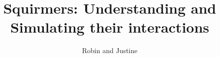 \documentclass[options]{article}
\begin{document}
\title{Squirmers: Understanding and Simulating their interactions}
\author{Robin and Justine}
\maketitle



\nocite{*}


\end{document}
